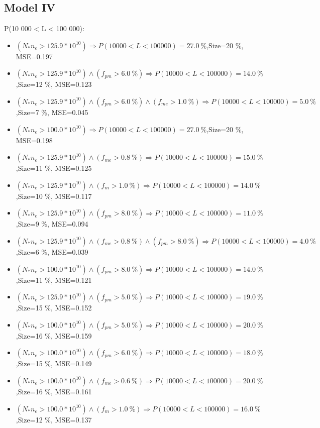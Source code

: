 \documentclass[numbered]{CSL}
\begin{document}
\subsection{Model IV}
P(10 000 < L < 100 000):
\begin{itemize}
\item $(N_* n_e > 125.9 * 10^{10}) \Rightarrow P(10 000 < L < 100 000) = 27.0~\%$,\hfill Size=20 \%, MSE=0.197
\item $(N_* n_e > 125.9 * 10^{10}) \land (f_{pm} > 6.0~\%) \Rightarrow P(10 000 < L < 100 000) = 14.0~\%$,\hfill Size=12 \%, MSE=0.123
\item $(N_* n_e > 125.9 * 10^{10}) \land (f_{pm} > 6.0~\%) \land (f_{me} > 1.0~\%) \Rightarrow P(10 000 < L < 100 000) = 5.0~\%$,\hfill Size=7 \%, MSE=0.045
\item $(N_* n_e > 100.0 * 10^{10}) \Rightarrow P(10 000 < L < 100 000) = 27.0~\%$,\hfill Size=20 \%, MSE=0.198
\item $(N_* n_e > 125.9 * 10^{10}) \land (f_{me} > 0.8~\%) \Rightarrow P(10 000 < L < 100 000) = 15.0~\%$,\hfill Size=11 \%, MSE=0.125
\item $(N_* n_e > 125.9 * 10^{10}) \land (f_m > 1.0~\%) \Rightarrow P(10 000 < L < 100 000) = 14.0~\%$,\hfill Size=10 \%, MSE=0.117
\item $(N_* n_e > 125.9 * 10^{10}) \land (f_{pm} > 8.0~\%) \Rightarrow P(10 000 < L < 100 000) = 11.0~\%$,\hfill Size=9 \%, MSE=0.094
\item $(N_* n_e > 125.9 * 10^{10}) \land (f_{me} > 0.8~\%) \land (f_{pm} > 8.0~\%) \Rightarrow P(10 000 < L < 100 000) = 4.0~\%$,\hfill Size=6 \%, MSE=0.039
\item $(N_* n_e > 100.0 * 10^{10}) \land (f_{pm} > 8.0~\%) \Rightarrow P(10 000 < L < 100 000) = 14.0~\%$,\hfill Size=11 \%, MSE=0.121
\item $(N_* n_e > 125.9 * 10^{10}) \land (f_{pm} > 5.0~\%) \Rightarrow P(10 000 < L < 100 000) = 19.0~\%$,\hfill Size=15 \%, MSE=0.152
\item $(N_* n_e > 100.0 * 10^{10}) \land (f_{pm} > 5.0~\%) \Rightarrow P(10 000 < L < 100 000) = 20.0~\%$,\hfill Size=16 \%, MSE=0.159
\item $(N_* n_e > 100.0 * 10^{10}) \land (f_{pm} > 6.0~\%) \Rightarrow P(10 000 < L < 100 000) = 18.0~\%$,\hfill Size=15 \%, MSE=0.149
\item $(N_* n_e > 100.0 * 10^{10}) \land (f_{me} > 0.6~\%) \Rightarrow P(10 000 < L < 100 000) = 20.0~\%$,\hfill Size=16 \%, MSE=0.161
\item $(N_* n_e > 100.0 * 10^{10}) \land (f_m > 1.0~\%) \Rightarrow P(10 000 < L < 100 000) = 16.0~\%$,\hfill Size=12 \%, MSE=0.137

\end{itemize}
\end{document}
